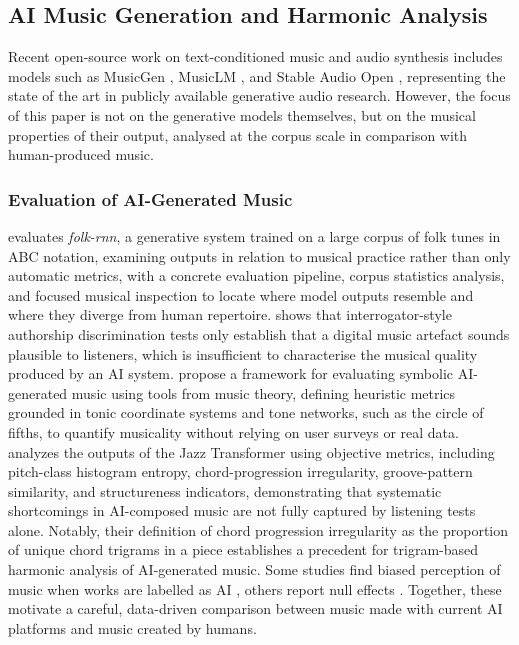 \documentclass{article}
\begin{document}
\subsection{AI Music Generation and Harmonic Analysis}
Recent open-source work on text-conditioned music and audio synthesis includes models such as MusicGen \citep{copet2023simple}, MusicLM \citep{agostinelli2023musiclm}, and Stable Audio Open \citep{evans2025stable}, representing the state of the art in publicly available generative audio research. However, the focus of this paper is not on the generative models themselves, but on the musical properties of their output, analysed at the corpus scale in comparison with human-produced music.

\subsubsection{Evaluation of AI-Generated Music}
\citet{Sturm2016c} evaluates \textit{folk-rnn}, a generative system trained on a large corpus of folk tunes in ABC notation, examining outputs in relation to musical practice rather than only automatic metrics, with a concrete evaluation pipeline, corpus statistics analysis, and focused musical inspection to locate where model outputs resemble and where they diverge from human repertoire. \citet{Ariza2009a} shows that interrogator-style authorship discrimination tests only establish that a digital music artefact sounds plausible to listeners, which is insufficient to characterise the musical quality produced by an AI system. \citet{dervakos2021heuristics} propose a framework for evaluating symbolic AI-generated music using tools from music theory, defining heuristic metrics grounded in tonic coordinate systems and tone networks, such as the circle of fifths, to quantify musicality without relying on user surveys or real data. \citet{wu2020jazz} analyzes the outputs of the Jazz Transformer using objective metrics, including pitch-class histogram entropy, chord-progression irregularity, groove-pattern similarity, and structureness indicators, demonstrating that systematic shortcomings in AI-composed music are not fully captured by listening tests alone. Notably, their definition of chord progression irregularity as the proportion of unique chord trigrams in a piece establishes a precedent for trigram-based harmonic analysis of AI-generated music. Some studies find biased perception of music when works are labelled as AI \citep{Ragot2020t,Shank2022q,Deguernel2023a}, others report null effects \citep{Pasquier2016a,Zlatkov2023a}. Together, these motivate a careful, data-driven comparison between music made with current AI platforms and music created by humans.
\end{document}
